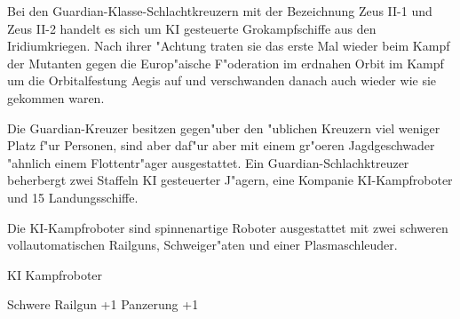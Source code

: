 
Bei den Guardian-Klasse-Schlachtkreuzern mit der Bezeichnung Zeus II-1 und Zeus II-2 handelt es sich um KI gesteuerte Gro\3kampfschiffe aus den Iridiumkriegen. Nach ihrer "Achtung traten sie das erste Mal wieder beim Kampf der Mutanten gegen die Europ"aische F"oderation im erdnahen Orbit im Kampf um die Orbitalfestung Aegis auf und verschwanden danach auch wieder wie sie gekommen waren.

Die Guardian-Kreuzer besitzen gegen"uber den "ublichen Kreuzern viel weniger Platz f"ur Personen, sind aber daf"ur aber mit einem gr"o\3eren Jagdgeschwader "ahnlich einem Flottentr"ager ausgestattet. Ein Guardian-Schlachktreuzer beherbergt zwei Staffeln KI gesteuerter J"agern, eine Kompanie KI-Kampfroboter und 15 Landungsschiffe.

Die KI-Kampfroboter sind spinnenartige Roboter ausgestattet mit zwei schweren vollautomatischen Railguns, Schwei\3ger"aten und einer Plasmaschleuder.

\begin{nscsheet}[f]{KI Kampfroboter}
    \nscstats[ATT=3,AGG=3,CON=2]
    \nscruler
    \begin{nscinventory}
        \nscitem[Waffen] Schwere Railgun +1
        \nscitem[R"ustung] Panzerung +1
    \end{nscinventory}
\end{nscsheet}
